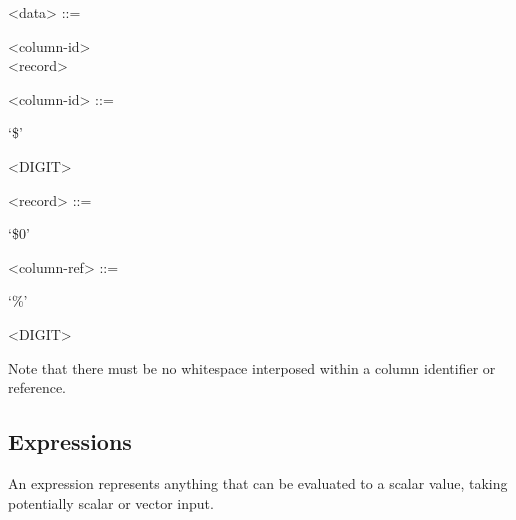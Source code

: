 \begin{grammar}
  <data> ::= \begin{syntdiag}
    \begin{stack}
      <column-id> \\
      <record>
    \end{stack}
  \end{syntdiag}

  <column-id> ::= \begin{syntdiag}
    `\$'
    \begin{rep}
      <DIGIT>
    \end{rep}
  \end{syntdiag}

  <record> ::= \begin{syntdiag}
    `\$0'
  \end{syntdiag}

  <column-ref> ::= \begin{syntdiag}
    `\%'
    \begin{rep}
      <DIGIT>
    \end{rep}
  \end{syntdiag}
\end{grammar}

Note that there must be no whitespace interposed within a column
identifier or reference.

\subsection{Expressions}

An expression represents anything that can be evaluated to a scalar
value, taking potentially scalar or vector input.

